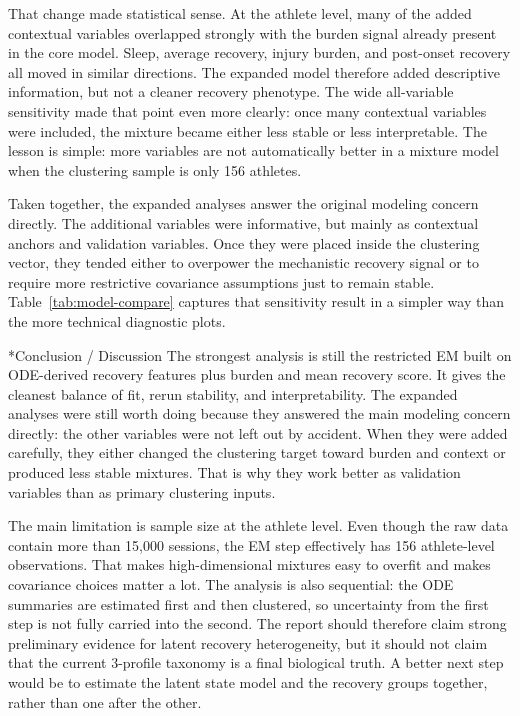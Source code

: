 \documentclass[11pt]{article}
\makeatletter
\renewcommand\section{\@startsection{section}{1}{0pt}{0.38em}{0.14em}{\bfseries\normalsize}}
\makeatother
\begin{document}
That change made statistical sense. At the athlete level, many of the added contextual variables overlapped strongly with the burden signal already present in the core model. Sleep, average recovery, injury burden, and post-onset recovery all moved in similar directions. The expanded model therefore added descriptive information, but not a cleaner recovery phenotype. The wide all-variable sensitivity made that point even more clearly: once many contextual variables were included, the mixture became either less stable or less interpretable. The lesson is simple: more variables are not automatically better in a mixture model when the clustering sample is only 156 athletes.

Taken together, the expanded analyses answer the original modeling concern directly. The additional variables were informative, but mainly as contextual anchors and validation variables. Once they were placed inside the clustering vector, they tended either to overpower the mechanistic recovery signal or to require more restrictive covariance assumptions just to remain stable. Table~\ref{tab:model-compare} captures that sensitivity result in a simpler way than the more technical diagnostic plots.

\section*{Conclusion / Discussion}
The strongest analysis is still the restricted EM built on ODE-derived recovery features plus burden and mean recovery score. It gives the cleanest balance of fit, rerun stability, and interpretability. The expanded analyses were still worth doing because they answered the main modeling concern directly: the other variables were not left out by accident. When they were added carefully, they either changed the clustering target toward burden and context or produced less stable mixtures. That is why they work better as validation variables than as primary clustering inputs.

The main limitation is sample size at the athlete level. Even though the raw data contain more than 15{,}000 sessions, the EM step effectively has 156 athlete-level observations. That makes high-dimensional mixtures easy to overfit and makes covariance choices matter a lot. The analysis is also sequential: the ODE summaries are estimated first and then clustered, so uncertainty from the first step is not fully carried into the second. The report should therefore claim strong preliminary evidence for latent recovery heterogeneity, but it should not claim that the current 3-profile taxonomy is a final biological truth. A better next step would be to estimate the latent state model and the recovery groups together, rather than one after the other.
\end{document}
